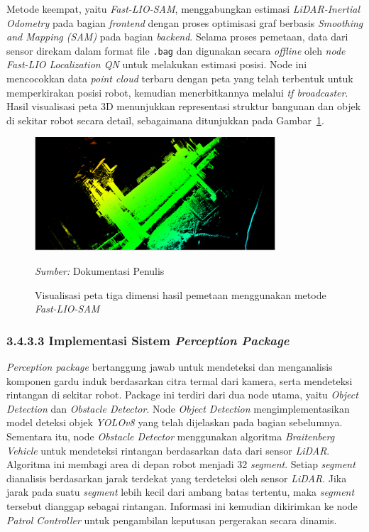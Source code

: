 Metode keempat, yaitu \emph{Fast-LIO-SAM}, menggabungkan estimasi \emph{LiDAR-Inertial Odometry} pada bagian \emph{frontend} dengan proses optimisasi graf berbasis \emph{Smoothing and Mapping (SAM)} pada bagian \emph{backend}. Selama proses pemetaan, data dari sensor direkam dalam format file \texttt{.bag} dan digunakan secara \emph{offline} oleh \emph{node} \emph{Fast-LIO Localization QN} untuk melakukan estimasi posisi. Node ini mencocokkan data \emph{point cloud} terbaru dengan peta yang telah terbentuk untuk memperkirakan posisi robot, kemudian menerbitkannya melalui \emph{tf broadcaster}. Hasil visualisasi peta 3D menunjukkan representasi struktur bangunan dan objek di sekitar robot secara detail, sebagaimana ditunjukkan pada Gambar~\ref{fig:fastlio-sam-map}.

\begin{figure}[H]
  \centering
  \includegraphics[width=0.8\textwidth]{gambar/bab3/poincloud-map.png}  
  \caption{Visualisasi peta tiga dimensi hasil pemetaan menggunakan metode \emph{Fast-LIO-SAM}}
  \label{fig:fastlio-sam-map}
  \footnotesize{\emph{Sumber:} Dokumentasi Penulis}
\end{figure}


\subsubsection{3.4.3.3 Implementasi Sistem \emph{Perception Package}}

\emph{Perception package} bertanggung jawab untuk mendeteksi dan menganalisis komponen gardu induk berdasarkan citra termal dari kamera, serta mendeteksi rintangan di sekitar robot. Package ini terdiri dari dua node utama, yaitu \emph{Object Detection} dan \emph{Obstacle Detector}. Node \emph{Object Detection} mengimplementasikan model deteksi objek \emph{YOLOv8} yang telah dijelaskan pada bagian sebelumnya. Sementara itu, node \emph{Obstacle Detector} menggunakan algoritma \emph{Braitenberg Vehicle} untuk mendeteksi rintangan berdasarkan data dari sensor \emph{LiDAR}. Algoritma ini membagi area di depan robot menjadi 32 \emph{segment}. Setiap \emph{segment} dianalisis berdasarkan jarak terdekat yang terdeteksi oleh sensor \emph{LiDAR}. Jika jarak pada suatu \emph{segment} lebih kecil dari ambang batas tertentu, maka \emph{segment} tersebut dianggap sebagai rintangan. Informasi ini kemudian dikirimkan ke node \emph{Patrol Controller} untuk pengambilan keputusan pergerakan secara dinamis.

